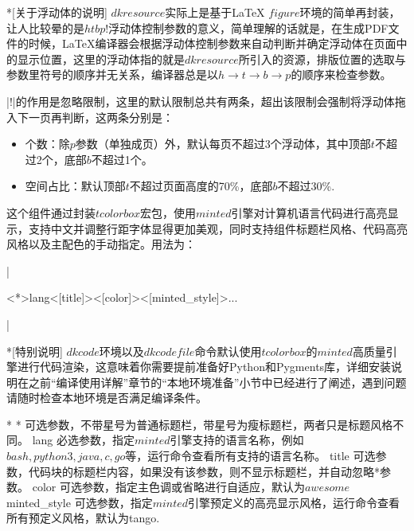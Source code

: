 \begin{dkcomment}*[关于浮动体的说明]
  \hspace{2em}$dkresource$实际上是基于{\LaTeX} $figure$环境的简单再封装，让人比较晕的是$htbp!$浮动体控制参数的意义，简单理解的话就是，在生成PDF文件的时候，{\LaTeX}编译器会根据浮动体控制参数来自动判断并确定浮动体在页面中的显示位置，这里的浮动体指的就是$dkresource$所引入的资源，排版位置的选取与参数里符号的顺序并无关系，编译器总是以$h \to t \to b \to p$的顺序来检查参数。

  \hspace{2em}|!|的作用是忽略限制，这里的默认限制总共有两条，超出该限制会强制将浮动体拖入下一页再判断，这两条分别是：

  \begin{itemize}
    \item 个数：除$p$参数（单独成页）外，默认每页不超过3个浮动体，其中顶部$t$不超过2个，底部$b$不超过1个。
    \item 空间占比：默认顶部$t$不超过页面高度的70\%，底部$b$不超过30\%.
  \end{itemize}
\end{dkcomment}

这个组件通过封装$tcolorbox$宏包，使用$minted$引擎对计算机语言代码进行高亮显示，支持中文并调整行距字体显得更加美观，同时支持组件标题栏风格、代码高亮风格以及主配色的手动指定。用法为：

|\begin{dkcode}<*>{lang}<[title]><[color]><[minted_style]>...\end{dkcode}|

\begin{dkcomment}*[特别说明]
  $dkcode$环境以及$dkcodefile$命令默认使用$tcolorbox$的$minted$高质量引擎进行代码渲染，这意味着你需要提前准备好Python和Pygments库，详细安装说明在之前“编译使用详解”章节的“本地环境准备”小节中已经进行了阐述，遇到问题请随时检查本地环境是否满足编译条件。
\end{dkcomment}

\begin{cvskills}*
  \cvskill
  {*}
  {可选参数，不带星号为普通标题栏，带星号为瘦标题栏，两者只是标题风格不同。}
  \cvskill
  {lang}
  {必选参数，指定$minted$引擎支持的语言名称，例如$bash, python3, java, c, go$等，运行命令查看所有支持的语言名称。}
  \cvskill
  {title}
  {可选参数，代码块的标题栏内容，如果没有该参数，则不显示标题栏，并自动忽略*参数。}
  \cvskill
  {color}
  {可选参数，指定主色调或省略进行自适应，默认为$awesome$}
  \cvskill
  {minted\_style}
  {可选参数，指定$minted$引擎预定义的高亮显示风格，运行命令查看所有预定义风格，默认为tango.}
\end{cvskills}

